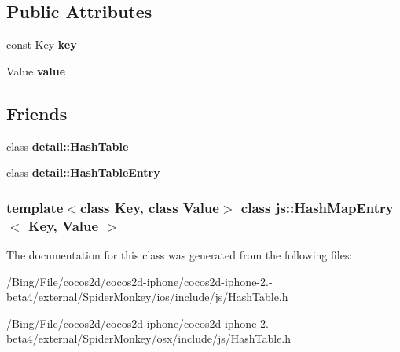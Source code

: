 \subsection*{Public Attributes}
\begin{DoxyCompactItemize}
\item 
\hypertarget{classjs_1_1_hash_map_entry_a1956547e7d90e068b98c328fb1d60a6b}{const Key {\bfseries key}}\label{classjs_1_1_hash_map_entry_a1956547e7d90e068b98c328fb1d60a6b}

\item 
\hypertarget{classjs_1_1_hash_map_entry_a7c38cbf237e2b391887aae7d98db140a}{Value {\bfseries value}}\label{classjs_1_1_hash_map_entry_a7c38cbf237e2b391887aae7d98db140a}

\end{DoxyCompactItemize}
\subsection*{Friends}
\begin{DoxyCompactItemize}
\item 
\hypertarget{classjs_1_1_hash_map_entry_a05ec7fc9c6cb1c946f92d19e245754ab}{class {\bfseries detail\-::\-Hash\-Table}}\label{classjs_1_1_hash_map_entry_a05ec7fc9c6cb1c946f92d19e245754ab}

\item 
\hypertarget{classjs_1_1_hash_map_entry_a0f502408ecedbf419a366b95e57def18}{class {\bfseries detail\-::\-Hash\-Table\-Entry}}\label{classjs_1_1_hash_map_entry_a0f502408ecedbf419a366b95e57def18}

\end{DoxyCompactItemize}
\subsubsection*{template$<$class Key, class Value$>$ class js\-::\-Hash\-Map\-Entry$<$ Key, Value $>$}



The documentation for this class was generated from the following files\-:\begin{DoxyCompactItemize}
\item 
/\-Bing/\-File/cocos2d/cocos2d-\/iphone/cocos2d-\/iphone-\/2.-\/beta4/external/\-Spider\-Monkey/ios/include/js/Hash\-Table.\-h\item 
/\-Bing/\-File/cocos2d/cocos2d-\/iphone/cocos2d-\/iphone-\/2.-\/beta4/external/\-Spider\-Monkey/osx/include/js/Hash\-Table.\-h\end{DoxyCompactItemize}
